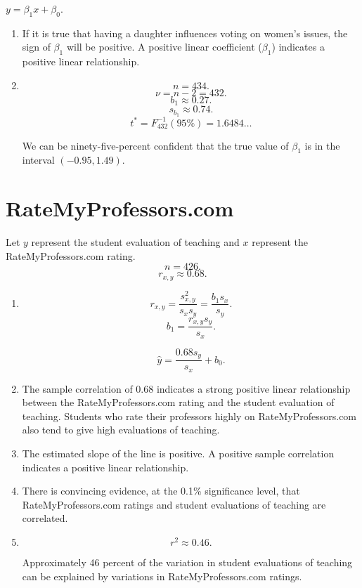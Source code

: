 \documentclass[12pt]{article}
\begin{document}
$y=\beta_1x+\beta_0.$

\begin{enumerate}
\item If it is true that having a daughter influences voting on women's issues, the sign of $\beta_1$ will be positive. A positive linear coefficient ($\beta_1$) indicates a positive linear relationship.
\item
\[n=434.\]
\[\nu=n-2=432.\]
\[b_1\approx 0.27.\]
\[s_{b_1}\approx 0.74.\]
\[t^*=F^{-1}_{432}(95\%)=1.6484\dots\]

We can be ninety-five-percent confident that the true value of $\beta_1$ is in the interval $(-0.95,1.49)$.
\end{enumerate}
\section{RateMyProfessors.com}
Let $y$ represent the student evaluation of teaching and $x$ represent the RateMyProfessors.com rating.
\[n=426.\]
\[r_{x,y}\approx 0.68.\]
\begin{enumerate}
\item
\[r_{x,y}=\frac{s^2_{x,y}}{s_xs_y}=\frac{b_1s_x}{s_y}.\]
\[b_1=\frac{r_{x,y}s_y}{s_x}.\]

\[\hat{y}=\frac{0.68s_y}{s_x}+b_0.\]
\item The sample correlation of 0.68 indicates a strong positive linear relationship between the RateMyProfessors.com rating and the student evaluation of teaching. Students who rate their professors highly on RateMyProfessors.com also tend to give high evaluations of teaching.
\item The estimated slope of the line is positive. A positive sample correlation indicates a positive linear relationship.
\item There is convincing evidence, at the 0.1\% significance level, that RateMyProfessors.com ratings and student evaluations of teaching are correlated.
\item\[r^2\approx 0.46.\]

Approximately 46 percent of the variation in student evaluations of teaching can be explained by variations in RateMyProfessors.com ratings.
\end{enumerate}
\end{document}
